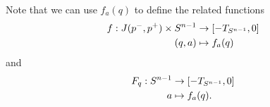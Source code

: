 Note that we can use $f_a(q)$ to define the related functions \begin{align*}
    f:J(p^-,p^+) \times {S^{n-1}} &\to [-T_{S^{n-1}},0]\\
    (q,a)&\mapsto f_a(q)
\end{align*} and 
\begin{align*}
    F_q:{S^{n-1}} &\to [-T_{S^{n-1}},0]\\
     a&\mapsto f_a(q).
\end{align*}




